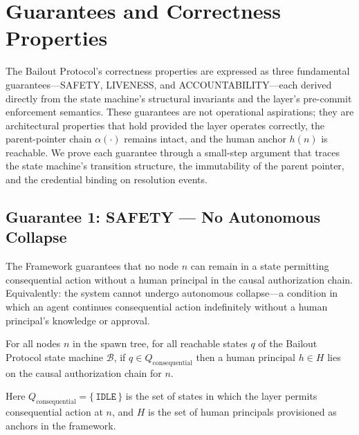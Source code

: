 \section{Guarantees and Correctness Properties}
\label{sec:guarantees}

The Bailout Protocol's correctness properties are expressed as three
fundamental guarantees---SAFETY, LIVENESS, and ACCOUNTABILITY---each derived
directly from the state machine's structural invariants and the \fact{}
layer's pre-commit enforcement semantics.  These guarantees are not
operational aspirations; they are architectural properties that hold
provided the \fact{} layer operates correctly, the parent-pointer chain
$\alpha(\cdot)$ remains intact, and the human anchor $h(n)$ is reachable.
We prove each guarantee through a small-step argument that traces the
state machine's transition structure, the immutability of the parent pointer,
and the credential binding on resolution events.

\subsection{Guarantee 1: SAFETY --- No Autonomous Collapse}
\label{sec:safety}

\begin{definition}
\label{def:safety}
The \bxthree{} Framework guarantees that no node $n$ can remain in a state
permitting consequential action without a human principal in the causal
authorization chain.  Equivalently: the system cannot undergo autonomous
collapse---a condition in which an agent continues consequential action
indefinitely without a human principal's knowledge or approval.
\end{definition}

\begin{maintheorem}[SAFETY]
\label{th:safety}
For all nodes $n$ in the spawn tree, for all reachable states $q$ of the
Bailout Protocol state machine $\mathcal{B}$, if $q \in Q_{\text{consequential}}$
then a human principal $h \in H$ lies on the causal authorization chain for
$n$.

\medskip
\noindent Here $Q_{\text{consequential}} = \{\,\texttt{IDLE}\,\}$ is the set of
states in which the \fact{} layer permits consequential action at $n$, and
$H$ is the set of human principals provisioned as anchors in the framework.
\end{maintheorem}

